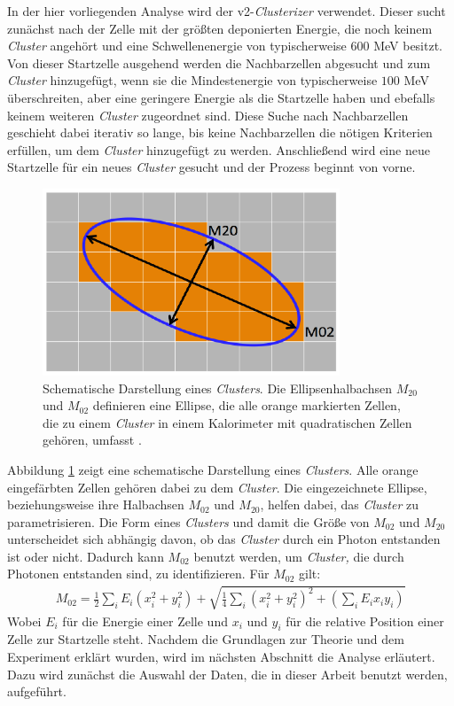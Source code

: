 In der hier vorliegenden Analyse wird der  v2-\textit{Clusterizer} verwendet.
Dieser sucht zunächst nach der Zelle mit der größten deponierten Energie, die noch keinem \textit{Cluster} angehört und eine Schwellenenergie von typischerweise $600$ MeV besitzt.
Von dieser Startzelle ausgehend werden die Nachbarzellen abgesucht und zum \textit{Cluster} hinzugefügt, wenn sie die Mindestenergie von typischerweise $100$ MeV überschreiten, aber eine geringere Energie als die Startzelle haben und ebefalls keinem weiteren \textit{Cluster} zugeordnet sind.
Diese Suche nach Nachbarzellen geschieht dabei iterativ so lange, bis keine Nachbarzellen die nötigen Kriterien erfüllen, um dem \textit{Cluster} hinzugefügt zu werden.
Anschließend wird eine neue Startzelle für ein neues \textit{Cluster} gesucht und der Prozess beginnt von vorne.
\begin{figure}[t!]
\centering
\includegraphics[width=.35\linewidth]{m02&m20.png}
\caption{Schematische Darstellung eines \textit{Clusters}. Die Ellipsenhalbachsen $M_{20}$ und $M_{02}$ definieren eine Ellipse, die alle orange markierten Zellen, die zu einem \textit{Cluster} in einem Kalorimeter mit quadratischen Zellen gehören, umfasst \cite{thesis:Adrian}.}
\label{fig:$M_{20}$}
\end{figure}
Abbildung \ref{fig:$M_{20}$} zeigt eine schematische Darstellung eines \textit{Clusters}.
Alle orange eingefärbten Zellen gehören dabei zu dem \textit{Cluster}.
Die eingezeichnete Ellipse, beziehungsweise ihre Halbachsen $M_{02}$ und $M_{20}$, helfen dabei, das \textit{Cluster} zu parametrisieren.
Die Form eines \textit{Clusters} und damit die Größe von $M_{02}$ und $M_{20}$ unterscheidet sich abhängig davon, ob das \textit{Cluster} durch ein Photon entstanden ist oder nicht.
Dadurch kann $M_{02}$ benutzt werden, um \textit{Cluster,} die durch Photonen entstanden sind, zu identifizieren.
Für $M_{02}$ gilt:
\begin{align} 
M_{02} = \frac{1}{2}\sum_{i}E_{i}(x_{i}^{2}+y_{i}^{2})+\sqrt{\frac{1}{4}\sum_{i}\left(x_{i}^{2}+y_{i}^{2}\right)^{2}+\left(\sum_{i}E_{i}x_{i}y_{i}\right)}
\end{align}
Wobei $E_{i}$ für die Energie einer Zelle und $x_{i}$ und $y_{i}$ für die relative Position einer Zelle zur Startzelle steht.
\newline
Nachdem die Grundlagen zur Theorie und dem Experiment erklärt wurden, wird im nächsten Abschnitt die Analyse erläutert.
Dazu wird zunächst die Auswahl der Daten, die in dieser Arbeit benutzt werden, aufgeführt.